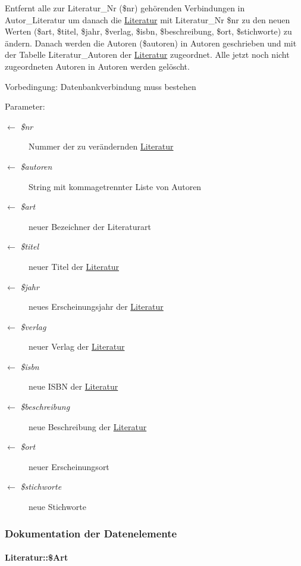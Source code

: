 Entfernt alle zur Literatur\_\-Nr (\$nr) gehörenden Verbindungen in Autor\_\-Literatur um danach die \hyperlink{classLiteratur}{Literatur} mit Literatur\_\-Nr \$nr zu den neuen Werten (\$art, \$titel, \$jahr, \$verlag, \$isbn, \$beschreibung, \$ort, \$stichworte) zu ändern. Danach werden die Autoren (\$autoren) in Autoren geschrieben und mit der Tabelle Literatur\_\-Autoren der \hyperlink{classLiteratur}{Literatur} zugeordnet. Alle jetzt noch nicht zugeordneten Autoren in Autoren werden gelöscht. \begin{Desc}
\item[Vorbedingung:]Datenbankverbindung muss bestehen \end{Desc}
\begin{Desc}
\item[Parameter:]
\begin{description}
\item[\mbox{$\leftarrow$} {\em \$nr}]Nummer der zu verändernden \hyperlink{classLiteratur}{Literatur} \item[\mbox{$\leftarrow$} {\em \$autoren}]String mit kommagetrennter Liste von Autoren \item[\mbox{$\leftarrow$} {\em \$art}]neuer Bezeichner der Literaturart \item[\mbox{$\leftarrow$} {\em \$titel}]neuer Titel der \hyperlink{classLiteratur}{Literatur} \item[\mbox{$\leftarrow$} {\em \$jahr}]neues Erscheinungsjahr der \hyperlink{classLiteratur}{Literatur} \item[\mbox{$\leftarrow$} {\em \$verlag}]neuer Verlag der \hyperlink{classLiteratur}{Literatur} \item[\mbox{$\leftarrow$} {\em \$isbn}]neue ISBN der \hyperlink{classLiteratur}{Literatur} \item[\mbox{$\leftarrow$} {\em \$beschreibung}]neue Beschreibung der \hyperlink{classLiteratur}{Literatur} \item[\mbox{$\leftarrow$} {\em \$ort}]neuer Erscheinungsort \item[\mbox{$\leftarrow$} {\em \$stichworte}]neue Stichworte\end{description}
\end{Desc}


\subsubsection{Dokumentation der Datenelemente}
\hypertarget{classLiteratur_fb4d4b1ce29a33a10e3e27d47f31a447}{
\paragraph[\$Art]{\setlength{\rightskip}{0pt plus 5cm}Literatur::\$Art}\hfill}
\label{classLiteratur_fb4d4b1ce29a33a10e3e27d47f31a447}


